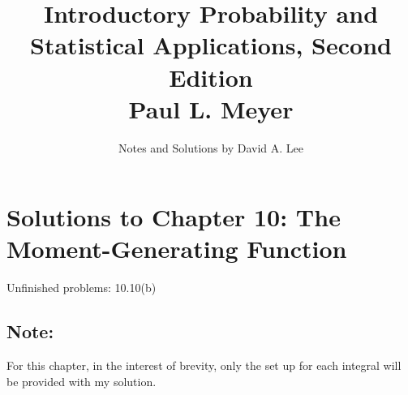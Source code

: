 \documentclass[10pt, oneside]{article}   	%
\title{Introductory Probability and Statistical Applications, Second Edition \\
\large{Paul L. Meyer}}
\author{Notes and Solutions by David A. Lee}
\date{}							%
\theoremstyle{definition}
\begin{document}
\maketitle
\section*{Solutions to Chapter 10: The Moment-Generating Function}

Unfinished problems: 10.10(b)

\subsection*{Note:}

For this chapter, in the interest of brevity, only the set up for each integral will be provided with my solution.
\end{document}
